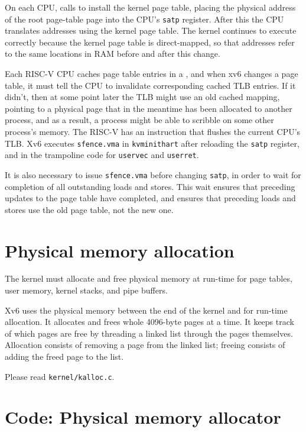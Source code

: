 On each CPU,
calls
to install the kernel page table,
placing
the physical address of the root page-table page
into the CPU's 
\texttt{satp}
register.
After this the CPU translates addresses using the kernel
page table. The kernel continues to execute correctly
because the kernel page table is direct-mapped, so that
addresses refer to the same locations in RAM before
and after this change.

Each RISC-V CPU caches page table entries in a
, and when xv6 changes
a page table, it must tell the CPU to invalidate corresponding
cached TLB entries.  If it didn't,
then at some point later the TLB might
use an old cached mapping, pointing to a physical page that in the meantime
has been allocated to another process, and as a result, a process
might be able to scribble on some other process's memory.  The RISC-V
has an instruction  that flushes
the current CPU's TLB.
Xv6 executes {\tt sfence.vma} in {\tt kvminithart}  after reloading the 
\texttt{satp} register, and in the trampoline code for
\lstinline{uservec} and \lstinline{userret}.

It is also necessary to issue \texttt{sfence.vma} before changing
\texttt{satp}, in order to wait for completion of all outstanding loads and
stores. This wait ensures that preceding updates to the page table have
completed, and ensures that preceding loads and stores use the old
page table, not the new one.

\section{Physical memory allocation}

The kernel must allocate and free physical memory at run-time for
page tables,
user memory,
kernel stacks,
and pipe buffers.

Xv6 uses the physical memory between the end of the kernel and
for run-time allocation. It allocates and frees whole 4096-byte pages
at a time. It keeps track of which pages are free by threading a
linked list through the pages themselves. Allocation consists of
removing a page from the linked list; freeing consists of adding the
freed page to the list.

Please read {\tt kernel/kalloc.c}.

\section{Code: Physical memory allocator}

